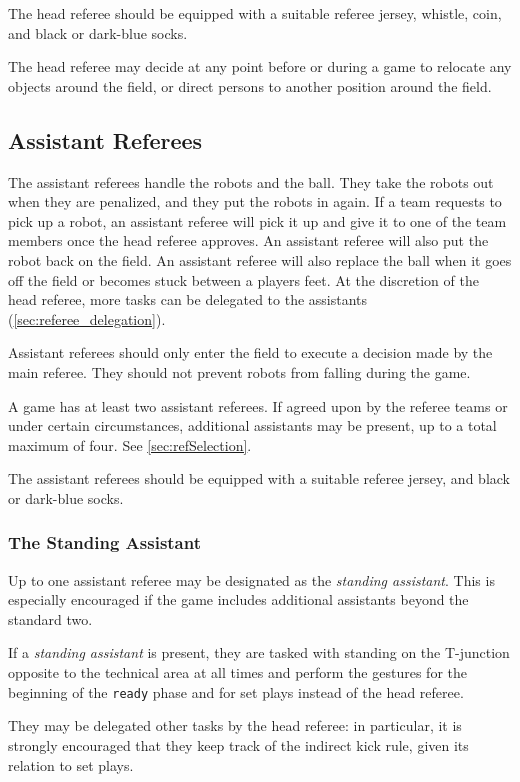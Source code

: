 The head referee should be equipped with a suitable referee jersey, whistle, coin, and black or dark-blue socks.

The head referee may decide at any point before or during a game to relocate any objects around the field, or direct persons to another position around the field.

\subsection{Assistant Referees}
\label{sec:assist_referee}

The assistant referees handle the robots and the ball.
They take the robots out when they are penalized, and they put the robots in again.
If a team requests to pick up a robot, an assistant referee will pick it up and give it to one of the team members once the head referee approves.
An assistant referee will also put the robot back on the field.
An assistant referee will also replace the ball when it goes off the field or becomes stuck between a players feet.
At the discretion of the head referee, more tasks can be delegated to the assistants (\cref{sec:referee_delegation}).

Assistant referees should only enter the field to execute a decision made by the main referee.
They should not prevent robots from falling during the game.

A game has at least two assistant referees. If agreed upon by the referee teams
or under certain circumstances, additional assistants may be present,
up to a total maximum of four. See \cref{sec:refSelection}.

The assistant referees should be equipped with a suitable referee jersey, and black or dark-blue socks.

\subsubsection{The Standing Assistant}

Up to one assistant referee may be designated as the \textit{standing assistant}.
This is especially encouraged if the game includes additional assistants
beyond the standard two.

If a \textit{standing assistant} is present, they are tasked with standing
on the T-junction opposite to the technical area at all times and perform
the gestures for the beginning of the \texttt{ready} phase and for set plays
instead of the head referee.

They may be delegated other tasks by the head referee: in particular, it is strongly
encouraged that they keep track of the indirect kick rule, given its relation
to set plays.

